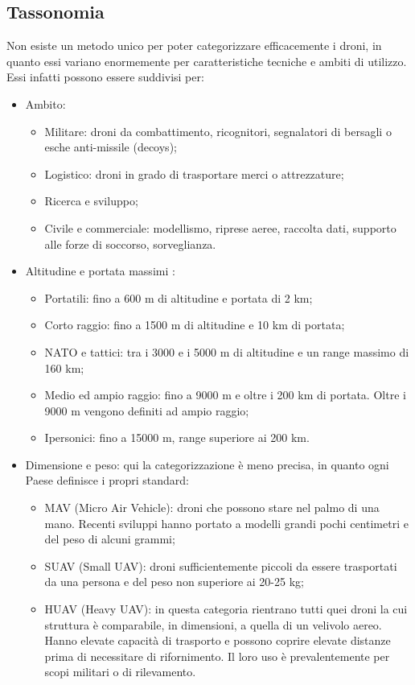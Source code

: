 \subsection[Tassonomia]{Tassonomia}
Non esiste un metodo unico per poter categorizzare efficacemente i droni, in quanto essi variano enormemente per caratteristiche tecniche e ambiti di utilizzo. Essi infatti possono essere suddivisi per:
\begin{itemize}
	\item Ambito:
		\begin{itemize}
			\item Militare: droni da combattimento, ricognitori, segnalatori di bersagli o esche anti-missile (decoys);
			\item Logistico: droni in grado di trasportare merci o attrezzature;
			\item Ricerca e sviluppo;
			\item Civile e commerciale: modellismo, riprese aeree, raccolta dati, supporto alle forze di soccorso, sorveglianza.
		\end{itemize}
	\item Altitudine e portata massimi \cite{uasglobal} :
		\begin{itemize}
			\item Portatili: fino a 600 m di altitudine e portata di 2 km; 
			\item Corto raggio: fino a 1500 m di altitudine e 10 km di portata;
			\item NATO e tattici: tra i 3000 e i 5000 m di altitudine e un range massimo di 160 km;
			\item Medio ed ampio raggio: fino a 9000 m e oltre i 200 km di portata. Oltre i 9000 m vengono definiti ad ampio raggio;
			\item Ipersonici:  fino a 15000 m, range superiore ai 200 km.
		\end{itemize}
	\item Dimensione e peso: qui la categorizzazione è meno precisa, in quanto ogni Paese definisce i propri standard:
		\begin{itemize}
			\item MAV (Micro Air Vehicle): droni che possono stare nel palmo di una mano. Recenti sviluppi hanno portato a modelli grandi pochi centimetri e del peso di alcuni grammi;
			\item SUAV (Small UAV): droni sufficientemente piccoli da essere trasportati da una persona e del peso non superiore ai 20-25 kg;
			\item HUAV (Heavy UAV):  in questa categoria rientrano tutti quei droni la cui struttura è comparabile, in dimensioni, a quella di un velivolo aereo. Hanno elevate capacità di trasporto e possono coprire elevate distanze prima di necessitare di rifornimento. Il loro uso è prevalentemente per scopi militari o di rilevamento.

\end{itemize}
\end{itemize}
